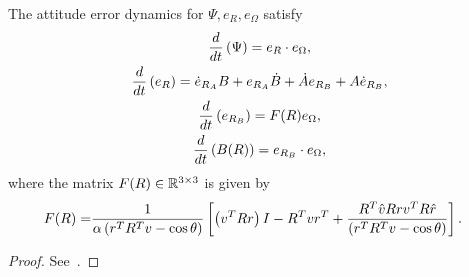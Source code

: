 \begin{prop}\label{prop:repulsive_error_dynamics}
	The attitude error dynamics for \( \Psi, e_R, e_\Omega \) satisfy 
	\begin{gather}
		\frac{d }{d t} \left( \Psi \right) = e_R \cdot e_\Omega , \label{eq:psi_dot}\\
		\frac{d }{d t} \left( e_R \right) = \dot{e}_{R_A} B + e_{R_A} \dot{B} + \dot{A}e_{R_B} + A \dot{e}_{R_B} , \label{eq:eR_dot} \\
		\frac{d }{d t} \left( e_{R_B} \right) = F(R) e_\Omega , \label{eq:eRB_dot} \\
		\frac{d }{d t} \left( B(R) \right) = e_{R_B} \cdot e_\Omega , \label{eq:B_dot} \\
	\end{gather}
	where the matrix \(F(R) \in \mathbb{R}^{3\times3} \) is given by
	\begin{align}
		F(R) = &\frac{1}{\alpha \left( r^T R^T v - \cos \theta \right)} \left[\left( v^T R r \right) I - R^T v r^T + \frac{R^T \hat{v} R r v^T R \hat{r}}{\left( r^T R^T v - \cos \theta \right)}\right]. \label{eq:F}
	\end{align}
\end{prop}
\begin{proof}
    See~.
\end{proof}

